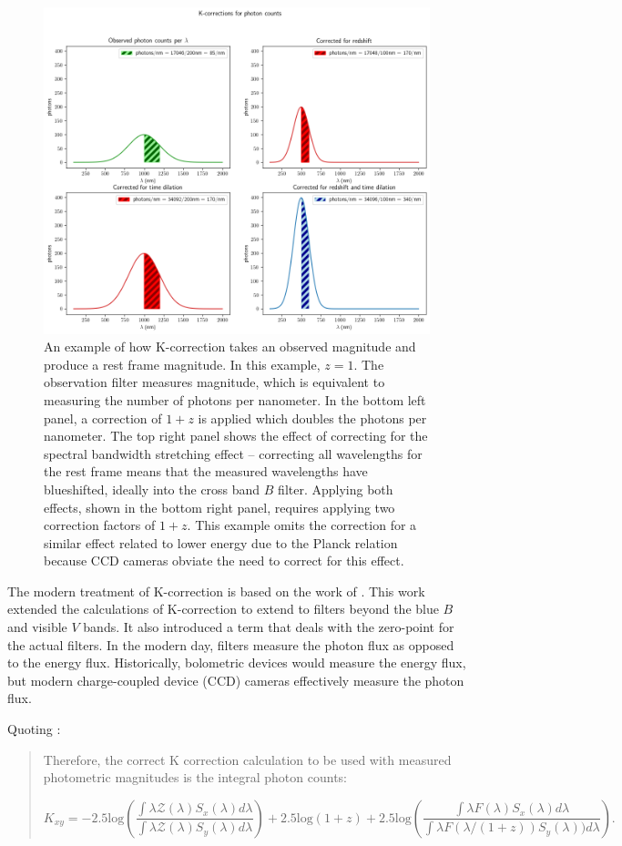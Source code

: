 \documentclass[linenumbers]{aastex631}
\begin{document}
\begin{figure}
  \includegraphics[width=.75\linewidth]{K-corrections_for_photon_counts.png}
  \caption{An example of how K-correction takes an observed magnitude and
  produce a rest frame magnitude. In this example, $z=1$. The observation
  filter measures magnitude, which is equivalent to measuring the number of
  photons per nanometer. In the bottom left panel, a correction of $1+z$ is
  applied which doubles the photons per nanometer. The top right panel shows
  the effect of correcting for the spectral bandwidth stretching effect --
  correcting all wavelengths for the rest frame means that the measured
  wavelengths have blueshifted, ideally into the cross band $B$ filter. Applying
  both effects, shown in the bottom right panel, requires applying two
  correction factors of $1+z$. This example omits the correction for a similar
  effect related to lower energy due to the Planck relation because CCD cameras
  obviate the need to correct for this effect.
  }
  \label{fig:k-example}
\end{figure}

The modern treatment of K-correction is based on the work of \citet{kim1996}.
This work extended the calculations of K-correction to extend to filters beyond
the blue $B$ and visible $V$ bands. It also introduced a term that deals with
the zero-point for the actual filters. In the modern day, filters measure the
photon flux as opposed to the energy flux. Historically, bolometric devices
would measure the energy flux, but modern charge-coupled device (CCD) cameras
effectively measure the photon flux.

Quoting \citet{kim1996}:

\begin{quote}
  Therefore, the correct K correction calculation to be used with measured
  photometric magnitudes is the integral photon counts:

  \begin{equation}
  \label{eq:kim}
    K_{xy} =
      -2.5\text{log} \left(
        \frac{\int \lambda \mathcal{Z}(\lambda)S_x(\lambda)d\lambda}
             {\int \lambda \mathcal{Z}(\lambda)S_y(\lambda)d\lambda}\right)
      + 2.5\text{log}(1+z)
      + 2.5\text{log}\left(
        \frac{\int \lambda F(\lambda)S_x(\lambda)d\lambda}
             {\int \lambda F(\lambda/(1+z))S_y(\lambda))d\lambda}\right).
  \end{equation}
\end{quote}
\end{document}
